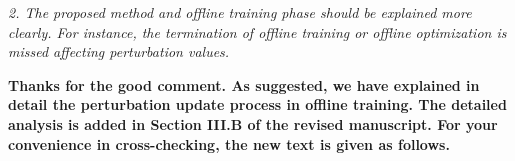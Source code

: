 \documentclass[12pt]{article}
\begin{document}

\textit{2. The proposed method and offline training phase should be explained more clearly. For instance, the termination of offline training or offline optimization is missed affecting perturbation values.}

\textbf{Thanks for the good comment. As suggested, we have explained in detail the perturbation update process in offline training.
The detailed analysis is added in Section III.B of the revised manuscript.
For your convenience in cross-checking, the new text is given as follows.}
\end{document}
